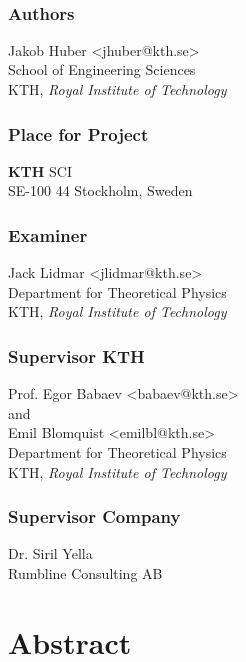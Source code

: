 \newpage
\thispagestyle{plain}
~\\
\vfill
{ 
	\subsection*{Authors}
	Jakob Huber <jhuber@kth.se>\\
	School of Engineering Sciences\\
	KTH, \textit{Royal Institute of Technology}
	
	\subsection*{Place for Project}
	\textbf{KTH} SCI\\
	SE-100 44 Stockholm, Sweden

	\subsection*{Examiner}
	Jack Lidmar <jlidmar@kth.se>\\
	Department for Theoretical Physics \\
	KTH, \textit{Royal Institute of Technology}
	
	\subsection*{Supervisor KTH}
	Prof. Egor Babaev <babaev@kth.se>\\
	and \\
	Emil Blomquist <emilbl@kth.se>\\
	Department for Theoretical Physics\\
	KTH, \textit{Royal Institute of Technology}


	\subsection*{Supervisor Company}
	Dr. Siril Yella \\
	Rumbline Consulting AB
}


\newpage
\thispagestyle{plain}
\chapter*{Abstract}

